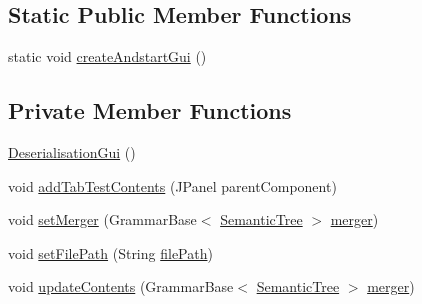 \subsection*{Static Public Member Functions}
\begin{DoxyCompactItemize}
\item 
static void \hyperlink{classit_1_1emarolab_1_1cagg_1_1debugging_1_1baseComponents_1_1DeserialisationGui_a133664a31052d40b4c03c79941c51a78}{create\-Andstart\-Gui} ()
\end{DoxyCompactItemize}
\subsection*{Private Member Functions}
\begin{DoxyCompactItemize}
\item 
\hyperlink{classit_1_1emarolab_1_1cagg_1_1debugging_1_1baseComponents_1_1DeserialisationGui_af6c7e06e37695e13c1031f5322ced6ad}{Deserialisation\-Gui} ()
\item 
void \hyperlink{classit_1_1emarolab_1_1cagg_1_1debugging_1_1baseComponents_1_1DeserialisationGui_a2fe83902d63120aa87aa94c26b15b639}{add\-Tab\-Test\-Contents} (J\-Panel parent\-Component)
\item 
void \hyperlink{classit_1_1emarolab_1_1cagg_1_1debugging_1_1baseComponents_1_1DeserialisationGui_a829ed7e2dda5cf5cda2b079c52d64acb}{set\-Merger} (Grammar\-Base$<$ \hyperlink{classit_1_1emarolab_1_1cagg_1_1core_1_1evaluation_1_1semanticGrammar_1_1SemanticTree}{Semantic\-Tree} $>$ \hyperlink{classit_1_1emarolab_1_1cagg_1_1debugging_1_1baseComponents_1_1DeserialisationGui_abcc08b9d27ccfd56afd93532c698edb3}{merger})
\item 
void \hyperlink{classit_1_1emarolab_1_1cagg_1_1debugging_1_1baseComponents_1_1DeserialisationGui_a5163a57348cef342135307196f2b2eab}{set\-File\-Path} (String \hyperlink{classit_1_1emarolab_1_1cagg_1_1debugging_1_1baseComponents_1_1DeserialisationGui_a399911d5a8594940a095db4753563a0d}{file\-Path})
\item 
void \hyperlink{classit_1_1emarolab_1_1cagg_1_1debugging_1_1baseComponents_1_1DeserialisationGui_adb14a06188b8e29acb2358202d0cfe45}{update\-Contents} (Grammar\-Base$<$ \hyperlink{classit_1_1emarolab_1_1cagg_1_1core_1_1evaluation_1_1semanticGrammar_1_1SemanticTree}{Semantic\-Tree} $>$ \hyperlink{classit_1_1emarolab_1_1cagg_1_1debugging_1_1baseComponents_1_1DeserialisationGui_abcc08b9d27ccfd56afd93532c698edb3}{merger})
\end{DoxyCompactItemize}
